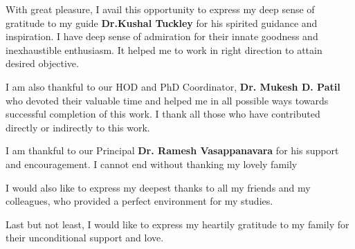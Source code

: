 \begin{acknowledgments}
With great pleasure, I avail this opportunity to express my deep
sense of gratitude to my guide \textbf{Dr.Kushal Tuckley } for his spirited guidance
and inspiration. I have deep sense of admiration for their innate
goodness and inexhaustible enthusiasm. It helped me to work in right
direction to attain desired objective.

I am also thankful to our HOD and PhD Coordinator,\textbf{ Dr. Mukesh D. Patil} who devoted their
valuable time and helped me in all possible ways towards successful
completion of this work. I thank all those who have contributed
directly or indirectly to this work.

I am thankful to our Principal \textbf{Dr. Ramesh Vasappanavara} for his support and
encouragement.
I cannot end without thanking my lovely family






I would also like to express my deepest thanks to all my friends and my colleagues, who provided a perfect environment for my studies.

Last but not least, I would like to express my heartily gratitude to my family for
their unconditional support and love.
\end{acknowledgments}

